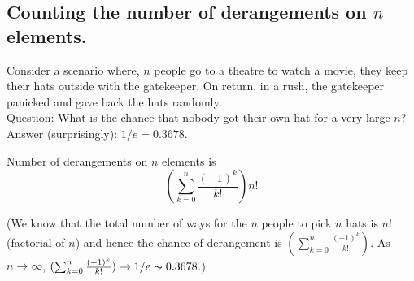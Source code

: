 \subsection{Counting the number of derangements on $n$ elements.} \label{subsec:derangements application}
Consider a scenario where, $n$ people go to a theatre to watch a movie, they keep their hats outside with the gatekeeper. On return, in a rush, the gatekeeper panicked and gave back the hats randomly.\\
Question: What is the chance that nobody got their own hat for a very large $n$?\\
Answer (surprisingly): $1/e = 0.3678$.
\begin{theorem}
Number of derangements on $n$ elements is $$(\sum_{k=0}^{n} \frac{(-1)^k}{k!})n! $$
\end{theorem}
\noindent
(We know that the total number of ways for the $n$ people to pick $n$ hats is $n!$ (factorial of $n$) and hence the chance of derangement is $(\sum_{k=0}^{n} \frac{(-1)^k}{k!})$. As $n\rightarrow\infty$, $(\sum_{k=0}^{n} \frac{(-1)^k}{k!}) \rightarrow 1/e \thicksim 0.3678$.)\\
